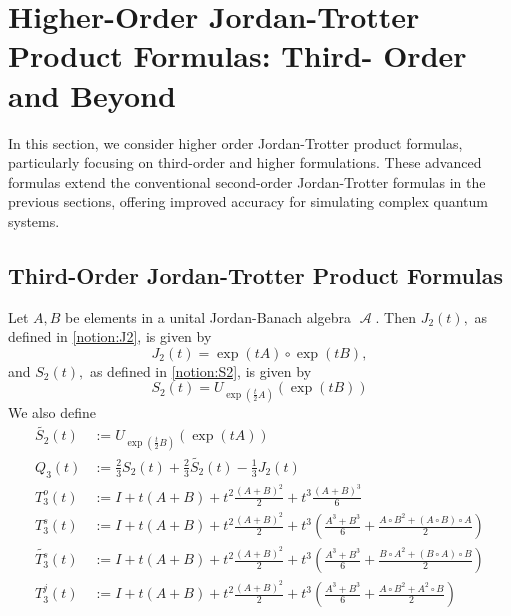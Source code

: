 \documentclass{article}
\theoremstyle{plain} %
\numberwithin{equation}{section}
\DeclareMathOperator{\Al}{{\mathcal A}}
\begin{document}
\section{Higher-Order Jordan-Trotter Product Formulas: Third- Order and Beyond}\label{sec:highOrder}
In this section, we consider higher order Jordan-Trotter product formulas, particularly focusing on third-order and higher formulations. These advanced formulas extend the conventional second-order Jordan-Trotter formulas in the previous sections, offering improved accuracy for simulating complex quantum systems. %

\subsection{Third-Order Jordan-Trotter Product Formulas}
Let $A, B$ be elements in a unital Jordan-Banach algebra $\Al.$ Then
$J_2(t),$ as defined in \cref{notion:J2}, is given by
\[
J_2(t)=\exp(tA)\circ \exp(tB),	
\]
and $S_2(t),$ as defined in \cref{notion:S2}, is given by 
\[
S_2(t)=	U_{\exp\left(\frac{t}{2}A \right)}(\exp\left(tB\right))
\]
We also define
\begin{align} 
\widetilde{S_2}(t)&:=U_{\exp\left(\frac{t}{2}B \right)}(\exp\left(tA\right)) \nonumber\\
Q_3(t)&:=\frac{2}{3}S_2(t)+\frac{2}{3}\widetilde{S_2}(t)-\frac{1}{3}J_2(t)\label{notion:Q3}\\
T^o_3(t)&:=	I + t(A + B) + t^2\frac{(A+B)^2}{2} + t^3\frac{(A+B)^3}{6} \nonumber \\
T^s_3(t)&:=I + t(A + B) + t^2\frac{(A+B)^2}{2}+t^3\left(\frac{A^3+B^3}{6}+\frac{A\circ B^2+(A\circ B)\circ A}{2}\right)\nonumber\\
\widetilde{T^s_3}(t)&:=I + t(A + B) + t^2\frac{(A+B)^2}{2}+t^3\left(\frac{A^3+B^3}{6}+\frac{B\circ A^2+(B\circ A)\circ B}{2}\right)\nonumber\\
T^j_3(t)&:=I + t(A + B) + t^2\frac{(A+B)^2}{2}+t^3\left(\frac{A^3+B^3}{6}+\frac{A\circ B^2+A^2\circ B}{2}\right)\nonumber
\end{align}
\end{document}
